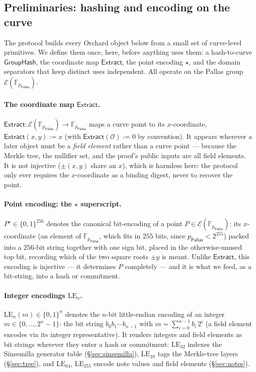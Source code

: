 \documentclass[11pt,a4paper]{article}
\theoremstyle{definition}
\newcommand{\F}{\mathbb{F}}
\newcommand{\Pallas}{\ensuremath{\mathsf{Pallas}}}
\newcommand{\Ep}{\ensuremath{\mathcal{E}}}
\newcommand{\Extract}{\ensuremath{\mathsf{Extract}}}
\newcommand{\GroupHash}{\ensuremath{\mathsf{GroupHash}}}
\begin{document}
\subsection{Preliminaries: hashing and encoding on the curve}\label{sec:prelim-curve}

The protocol builds every Orchard object below from a small set of curve-level
primitives. We define them once, here, before anything uses them: a
hash-to-curve $\GroupHash$, the coordinate map $\Extract$, the point
encoding $\star$, and the domain separators that keep distinct uses
independent. All operate on the Pallas group $\Ep(\F_{p_{\Pallas}})$.

\paragraph{The coordinate map $\Extract$.}
$\Extract : \Ep(\F_{p_{\Pallas}}) \to \F_{p_{\Pallas}}$ maps a curve point
to its $x$-coordinate, $\Extract(x, y) := x$ (with
$\Extract(\mathcal{O}) := 0$ by convention). It appears wherever a later
object must be a \emph{field element} rather than a curve point --- because
the Merkle tree, the nullifier set, and the proof's public inputs are all
field elements. It is not injective ($\pm(x,y)$ share an $x$), which is
harmless here: the protocol only ever requires the $x$-coordinate as a binding
digest, never to recover the point.

\paragraph{Point encoding: the $\star$ superscript.}
$P^\star \in \{0,1\}^{256}$ denotes the canonical bit-encoding of a point
$P \in \Ep(\F_{p_{\Pallas}})$: its $x$-coordinate (an element of
$\F_{p_{\Pallas}}$, which fits in $255$ bits, since $p_{\Pallas} < 2^{255}$) packed
into a $256$-bit string together with one sign bit, placed in the otherwise-unused
top bit, recording which of the two square roots $\pm y$ is meant. Unlike $\Extract$,
this encoding is injective --- it determines $P$ completely --- and it is what
we feed, as a bit-string, into a hash or commitment.

\paragraph{Integer encodings $\mathrm{LE}_n$.}
$\mathrm{LE}_n(m) \in \{0,1\}^n$ denotes the $n$-bit little-endian encoding
of an integer $m \in \{0, \dots, 2^n - 1\}$: the bit string
$b_0 b_1 \cdots b_{n-1}$ with $m = \sum_{i=0}^{n-1} b_i\, 2^{i}$ (a field
element encodes via its integer representative). It renders integers and
field elements as bit strings wherever they enter a hash or commitment:
$\mathrm{LE}_{32}$ indexes the Sinsemilla generator table
(\S\ref{sec:sinsemilla}), $\mathrm{LE}_{10}$ tags the Merkle-tree layers
(\S\ref{sec:tree}), and $\mathrm{LE}_{64}$, $\mathrm{LE}_{255}$ encode note
values and field elements (\S\ref{sec:notes}).
\end{document}
